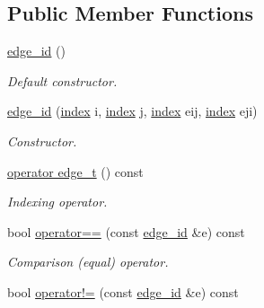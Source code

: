 \subsection*{Public Member Functions}
\begin{DoxyCompactItemize}
\item 
\hypertarget{structmerlin_1_1edge__id_a25b381b111897b738de30780ab918209}{}\hyperlink{structmerlin_1_1edge__id_a25b381b111897b738de30780ab918209}{edge\+\_\+id} ()\label{structmerlin_1_1edge__id_a25b381b111897b738de30780ab918209}

\begin{DoxyCompactList}\small\item\em Default constructor. \end{DoxyCompactList}\item 
\hyperlink{structmerlin_1_1edge__id_a941cde8b90f6251aaa51bda5bb15b50d}{edge\+\_\+id} (\hyperlink{structmerlin_1_1edge__id_af57e3c1f2c2c3194d96468a5f0e7cce0}{index} i, \hyperlink{structmerlin_1_1edge__id_af57e3c1f2c2c3194d96468a5f0e7cce0}{index} j, \hyperlink{structmerlin_1_1edge__id_af57e3c1f2c2c3194d96468a5f0e7cce0}{index} eij, \hyperlink{structmerlin_1_1edge__id_af57e3c1f2c2c3194d96468a5f0e7cce0}{index} eji)
\begin{DoxyCompactList}\small\item\em Constructor. \end{DoxyCompactList}\item 
\hypertarget{structmerlin_1_1edge__id_a68ca5f45ac200267ba879aaa3007e61a}{}\hyperlink{structmerlin_1_1edge__id_a68ca5f45ac200267ba879aaa3007e61a}{operator edge\+\_\+t} () const \label{structmerlin_1_1edge__id_a68ca5f45ac200267ba879aaa3007e61a}

\begin{DoxyCompactList}\small\item\em Indexing operator. \end{DoxyCompactList}\item 
\hypertarget{structmerlin_1_1edge__id_a46c12ab826171c62a5d80e309bea9a3a}{}bool \hyperlink{structmerlin_1_1edge__id_a46c12ab826171c62a5d80e309bea9a3a}{operator==} (const \hyperlink{structmerlin_1_1edge__id}{edge\+\_\+id} \&e) const \label{structmerlin_1_1edge__id_a46c12ab826171c62a5d80e309bea9a3a}

\begin{DoxyCompactList}\small\item\em Comparison (equal) operator. \end{DoxyCompactList}\item 
\hypertarget{structmerlin_1_1edge__id_abfe3dfe6fe440f8a975db5f7f9fbba0c}{}bool \hyperlink{structmerlin_1_1edge__id_abfe3dfe6fe440f8a975db5f7f9fbba0c}{operator!=} (const \hyperlink{structmerlin_1_1edge__id}{edge\+\_\+id} \&e) const \label{structmerlin_1_1edge__id_abfe3dfe6fe440f8a975db5f7f9fbba0c}


\end{DoxyCompactItemize}
